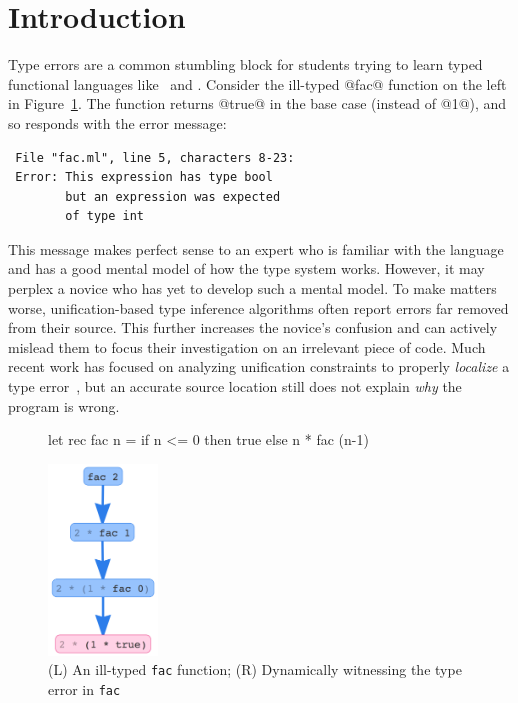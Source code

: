 \section{Introduction}
\label{sec:introduction}

Type errors are a common stumbling block for students
trying to learn typed functional languages like \ocaml\
and \haskell.
%
Consider the ill-typed @fac@ function on the left in
Figure~\ref{fig:factorial}.
%
The function returns @true@ in the base case (instead of @1@),
and so \ocaml responds with the error message:
%
\begin{verbatim}
 File "fac.ml", line 5, characters 8-23:
 Error: This expression has type bool
        but an expression was expected
        of type int
\end{verbatim}
%
This message makes perfect sense to an expert who is familiar
with the language and has a good mental model of how the type
system works.
%
However, it may perplex a novice who has yet to develop such a
mental model.
%
To make matters worse, unification-based type inference algorithms
often report errors far removed from their source.
%
This further increases the novice's confusion and can actively mislead
them to focus their investigation on an irrelevant piece of code.
%
Much recent work has focused on analyzing unification constraints
to properly \emph{localize} a type error~\cite{lerner_searching_2007,chen_counter-factual_2014,zhang_toward_2014,pavlinovic_finding_2014},
but an accurate source location still does not explain \emph{why} the
program is wrong.


\begin{figure}[t]
\centering
\begin{minipage}{.49\linewidth}
\centering
\begin{code}
  let rec fac n =
    if n <= 0 then
      true
    else
      n * fac (n-1)
\end{code}
\end{minipage}
\begin{minipage}{.49\linewidth}
\centering
  \includegraphics[height=2in]{fac-overview.png}
\end{minipage}
\caption{(L) An ill-typed \texttt{fac} function; (R) Dynamically witnessing the type error in \texttt{fac}}
\label{fig:factorial}
\end{figure}

